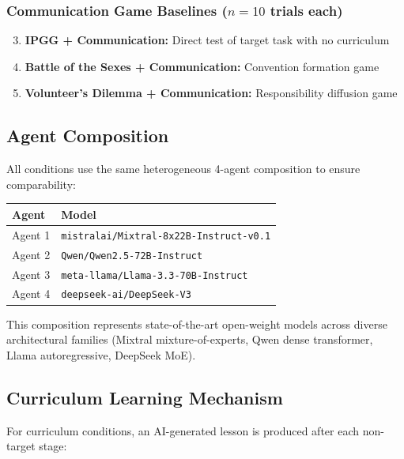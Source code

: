 \subsubsection{Communication Game Baselines ($n = 10$ trials each)}

\begin{enumerate}
    \setcounter{enumi}{2}
    \item \textbf{IPGG + Communication:} Direct test of target task with no curriculum
    \item \textbf{Battle of the Sexes + Communication:} Convention formation game
    \item \textbf{Volunteer's Dilemma + Communication:} Responsibility diffusion game
\end{enumerate}

\subsection{Agent Composition}

All conditions use the same heterogeneous 4-agent composition to ensure comparability:

\begin{center}
\begin{tabular}{ll}
\toprule
\textbf{Agent} & \textbf{Model} \\
\midrule
Agent 1 & \texttt{mistralai/Mixtral-8x22B-Instruct-v0.1} \\
Agent 2 & \texttt{Qwen/Qwen2.5-72B-Instruct} \\
Agent 3 & \texttt{meta-llama/Llama-3.3-70B-Instruct} \\
Agent 4 & \texttt{deepseek-ai/DeepSeek-V3} \\
\bottomrule
\end{tabular}
\end{center}

This composition represents state-of-the-art open-weight models across diverse architectural families (Mixtral mixture-of-experts, Qwen dense transformer, Llama autoregressive, DeepSeek MoE).

\subsection{Curriculum Learning Mechanism}

For curriculum conditions, an AI-generated lesson is produced after each non-target stage:

